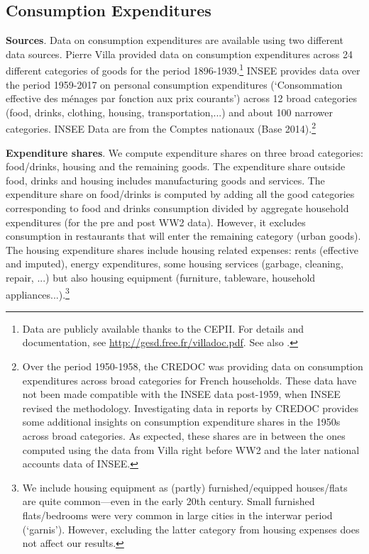 \documentclass[11pt]{report}
\begin{document}
\subsection{Consumption Expenditures}\label{A-sec:cons-expenditures}

\noindent \textbf{Sources}. Data on consumption expenditures are available using two different data sources. Pierre Villa provided data on consumption expenditures across 24 different categories of goods for the period 1896-1939.\footnote{Data are publicly available thanks to the CEPII. For details and documentation, see \url{http://gesd.free.fr/villadoc.pdf}. See also \cite{villa1993productivite}.} INSEE provides data over the period 1959-2017 on personal consumption expenditures (`Consommation effective des ménages par fonction aux prix courants') across 12 broad categories (food, drinks, clothing, housing, transportation,...) and about 100 narrower categories. INSEE Data are from the Comptes nationaux (Base 2014).\footnote{Over the period 1950-1958, the CREDOC was providing data on consumption expenditures across broad categories for French households. These data have not been made compatible with the INSEE data post-1959, when INSEE revised the methodology. Investigating data in reports by CREDOC provides some additional insights on consumption expenditure shares in the 1950s across broad categories. As expected, these shares are in between the ones computed using the data from Villa right before WW2 and the later national accounts data of INSEE.}

\smallskip
\noindent \textbf{Expenditure shares}. We compute expenditure shares on three broad categories: food/drinks, housing and the remaining goods. The expenditure share outside food, drinks and housing includes manufacturing goods and services. The expenditure share on food/drinks is computed by adding all the good categories corresponding to food and drinks consumption divided by aggregate household expenditures (for the pre and post WW2 data). However, it excludes consumption in restaurants that will enter the remaining category (urban goods). The housing expenditure shares include housing related expenses: rents (effective and imputed), energy expenditures, some housing services (garbage, cleaning, repair, ...) but also housing equipment (furniture, tableware, household appliances...).\footnote{We include housing equipment as (partly) furnished/equipped houses/flats are quite common---even in the early 20th century. Small furnished flats/bedrooms were very common in large cities in the interwar period (`garnis'). However, excluding the latter category from housing expenses does not affect our results.} 
\end{document}
